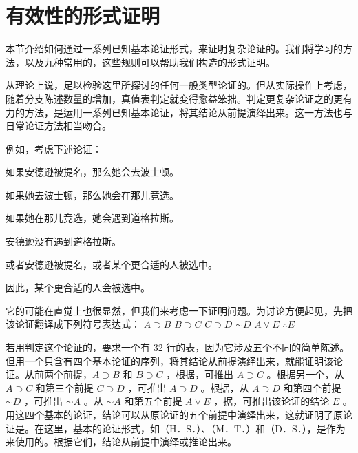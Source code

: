 \section{有效性的形式证明}

\begin{logicbox}[title=引言]
本节介绍如何通过一系列已知基本论证形式，来证明复杂论证的。我们将学习的方法，以及九种常用的，这些规则可以帮助我们构造的形式证明。
\end{logicbox}

从理论上说，足以检验这里所探讨的任何一般类型论证的。但从实际操作上考虑，随着分支陈述数量的增加，真值表判定就变得愈益笨拙。判定更复杂论证之的更有力的方法，是运用一系列已知基本论证，将其结论从前提演绎出来。这一方法也与日常论证方法相当吻合。

\begin{examplebox}[title=形式证明的应用实例]
例如，考虑下述论证：

如果安德逊被提名，那么她会去波士顿。

如果她去波士顿，那么她会在那儿竞选。

如果她在那儿竞选，她会遇到道格拉斯。

安德逊没有遇到道格拉斯。

或者安德逊被提名，或者某个更合适的人被选中。

因此，某个更合适的人会被选中。
\end{examplebox}

它的可能在直觉上也很显然，但我们来考虑一下证明问题。为讨论方便起见，先把该论证翻译成下列符号表达式：
$A \supset B$
$B \supset C$
$C \supset D$
$\sim D$
$A \vee E$
$\therefore E$

若用判定这个论证的，要求一个有 32 行的表，因为它涉及五个不同的简单陈述。但用一个只含有四个基本论证的序列，将其结论从前提演绎出来，就能证明该论证。从前两个前提，$A \supset B$ 和 $B \supset C$ ，根据，可推出 $A \supset C$ 。根据另一个，从 $A \supset C$ 和第三个前提 $C \supset D$ ，可推出 $A \supset D$ 。根据，从 $A \supset D$ 和第四个前提 $\sim D$ ，可推出 $\sim A$ 。从 $\sim A$ 和第五个前提 $A \vee E$ ，据，可推出该论证的结论 $E$ 。用这四个基本的论证，结论可以从原论证的五个前提中演绎出来，这就证明了原论证是。在这里，基本的论证形式，如（H．S．）、（M．T．）和（D．S．），是作为来使用的。根据它们，结论从前提中演绎或推论出来。

